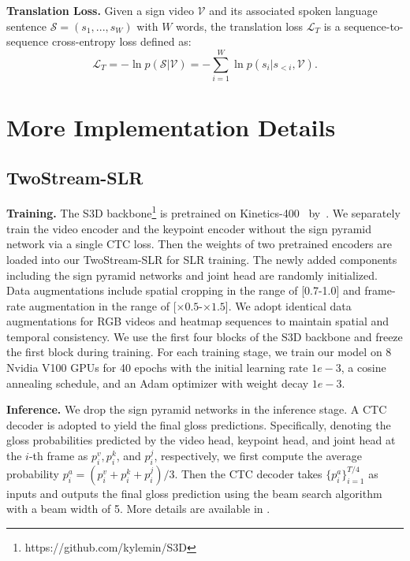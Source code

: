 \documentclass{article}
\begin{document}
\textbf{Translation Loss.} Given a sign video $\mathcal{V}$ and its associated spoken language sentence $\mathcal{S}=(s_1,...,s_W)$ with $W$ words, the translation loss $\mathcal{L}_{T}$ is a sequence-to-sequence cross-entropy loss defined as:
\begin{equation}\label{eq:l_t}
    \mathcal{L}_{T} = -\ln p(\mathcal{S}|\mathcal{V}) = -\sum_{i=1}^{W}\ln p(s_i|s_{<i},\mathcal{V}).
\end{equation}


\section{More Implementation Details}
\subsection{TwoStream-SLR}
\textbf{Training.}
The S3D backbone\footnote{https://github.com/kylemin/S3D} is pretrained on Kinetics-400~\cite{K400_dataset} by~\cite{min2019tased}. We separately train the video encoder and the keypoint encoder without the sign pyramid network via a single CTC loss. Then the weights of two pretrained encoders are loaded into our TwoStream-SLR for SLR training. The newly added components including the sign pyramid networks and joint head are randomly initialized. Data augmentations include spatial cropping in the range of [0.7-1.0] and frame-rate augmentation in the range of [$\times0.5$-$\times 1.5$]. We adopt identical data augmentations for RGB videos and heatmap sequences to maintain spatial and temporal consistency. We use the first four blocks of the S3D backbone and freeze the first block during training. For each training stage, we train our model on 8 Nvidia V100 GPUs for 40 epochs with the initial learning rate $1e-3$, a cosine annealing schedule, and an Adam optimizer with weight decay $1e-3$.


\textbf{Inference.} We drop the sign pyramid networks in the inference stage. A CTC decoder is adopted to yield the final gloss predictions.
Specifically, denoting the gloss probabilities predicted by the video head, keypoint head, and joint head at the $i$-th frame as $p_i^v, p_i^k$, and $p_i^j$, respectively, we first compute the average probability $p_i^a=(p_i^v+p_i^k+p_i^j)/3$.
Then the CTC decoder takes $\{p_i^a\}_{i=1}^{T/4}$ as inputs and outputs the final gloss prediction using the beam search algorithm with a beam width of 5. More details are available in \cite{graves2006connectionist}.
\end{document}
